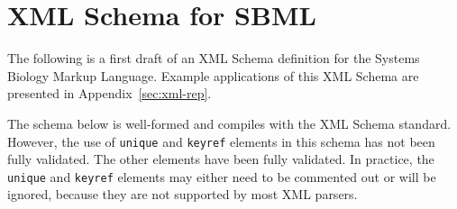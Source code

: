 \documentclass[10pt]{cek-article}
\begin{document}
\section{XML Schema for SBML}
\label{apdx:schemas}

The following is a first draft of an XML Schema definition for the Systems
Biology Markup Language.  Example applications of this XML Schema are
presented in Appendix~\ref{sec:xml-rep}.

The schema below is well-formed and compiles with the XML Schema standard.
However, the use of \texttt{unique} and \texttt{keyref} elements in this
schema has not been fully validated.  The other elements have been fully
validated.  In practice, the \texttt{unique} and \texttt{keyref} elements
may either need to be commented out or will be ignored, because they are
not supported by most XML parsers.
\end{document}
